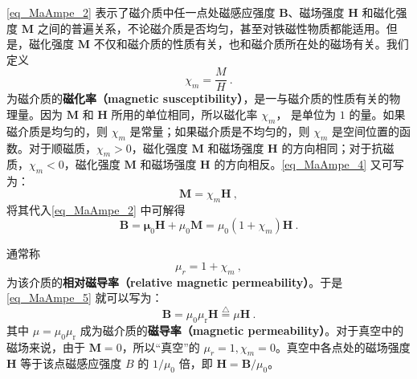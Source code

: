 \autoref{eq_MaAmpe_2} 表示了磁介质中任一点处磁感应强度 $\mathbf B$、磁场强度 $\mathbf H$ 和磁化强度 $\mathbf M $ 之间的普遍关系，不论磁介质是否均匀，甚至对铁磁性物质都能适用。但是，磁化强度 $\mathbf M $ 不仅和磁介质的性质有关，也和磁介质所在处的磁场有关。我们定义
\begin{equation} \label{eq_MaAmpe_4}
\chi_{m}=\frac{M}{H}~.
\end{equation}
为磁介质的\textbf{磁化率（magnetic susceptibility）}，是一与磁介质的性质有关的物理量。因为 $\mathbf M $ 和 $\mathbf H $ 所用的单位相同，所以磁化率 $\chi_m$， 是单位为 $1 $ 的量。如果磁介质是均匀的，则 $\chi_m$ 是常量；如果磁介质是不均匀的，则 $\chi_m$ 是空间位置的函数。对于顺磁质，$\chi_m>0$，磁化强度 $\mathbf M $ 和磁场强度 $\mathbf H $ 的方向相同；对于抗磁质，$\chi_m<0$，磁化强度 $\mathbf M $ 和磁场强度 $\mathbf H $ 的方向相反。\autoref{eq_MaAmpe_4} 又可写为：
\begin{equation} \label{eq_MaAmpe_5}
\mathbf M = \chi_m\mathbf H~,
\end{equation}
将其代入\autoref{eq_MaAmpe_2} 中可解得
\begin{equation}
\mathbf{B}=\mathbf{\mu}_{0} \mathbf{H}+\mu_{0} \mathbf{M}=\mu_{0}\left(1+\chi_{{m}}\right) \mathbf{H}~.
\end{equation}

通常称
\begin{equation}
\mu_{{r}}=1+\chi_{m}~,
\end{equation}
为该介质的\textbf{相对磁导率（relative magnetic permeability）}。于是\autoref{eq_MaAmpe_5} 就可以写为：
\begin{equation}
\mathbf B=\mu_{0} \mu_{\mathrm{r}} \mathbf H\overset{\triangle}=\mu \mathbf H~.
\end{equation}
其中 $\mu = \mu_{0} \mu_{\mathrm{r}} $ 成为磁介质的\textbf{磁导率（magnetic permeability）}。对于真空中的磁场来说，由于 $\mathbf M=0$，所以“真空”的 $\mu_r=1,\chi_m=0$。真空中各点处的磁场强度 $\mathbf H $ 等于该点磁感应强度 $B $ 的 $1/\mu_0$ 倍，即 $\mathbf H = \mathbf B / \mu_0$。